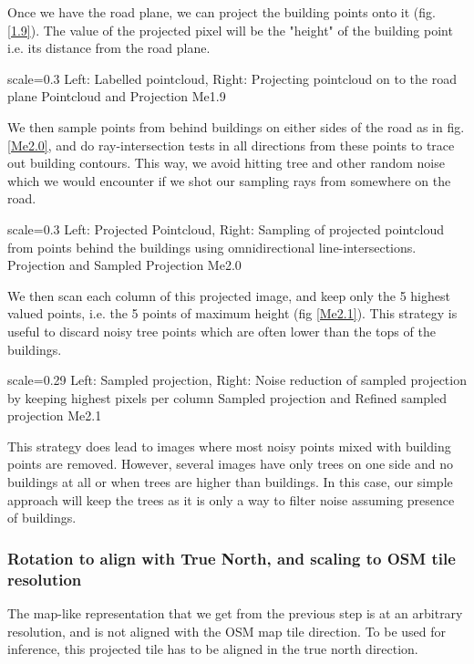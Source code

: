 Once we have the road plane, we can project the building points onto it (fig. \ref{1.9}). The value of the projected pixel will be the "height" of the building point i.e. its distance from the road plane. 

{scale=0.3}%
{Left: Labelled pointcloud, Right: Projecting pointcloud on to the road plane}%
{Pointcloud and Projection}%
{Me1.9}

We then sample points from behind buildings on either sides of the road as in fig. \ref{Me2.0}, and do ray-intersection tests in all directions from these points to trace out building contours. This way, we avoid hitting tree and other random noise which we would encounter if we shot our sampling rays from somewhere on the road. 

{scale=0.3}%
{Left: Projected Pointcloud, Right: Sampling of projected pointcloud from points behind the buildings using omnidirectional line-intersections.}%
{Projection and Sampled Projection}%
{Me2.0}

We then scan each column of this projected image, and keep only the 5 highest valued points, i.e. the 5 points of maximum height (fig \ref{Me2.1}). This strategy is useful to discard noisy tree points which are often lower than the tops of the buildings. 

{scale=0.29}%
{Left: Sampled projection, Right: Noise reduction of sampled projection by keeping highest pixels per column}%
{Sampled projection and Refined sampled projection}%
{Me2.1}

This strategy does lead to images where most noisy points mixed with building points are removed. However, several images have only trees on one side and no buildings at all or when trees are higher than buildings. In this case, our simple approach will keep the trees as it is only a way to filter noise assuming presence of buildings. 

\pagebreak
\subsubsection{Rotation to align with True North, and scaling to OSM tile resolution}
The map-like representation that we get from the previous step is at an arbitrary resolution, and is not aligned with the OSM map tile direction. To be used for inference, this projected tile has to be aligned in the true north direction. 

